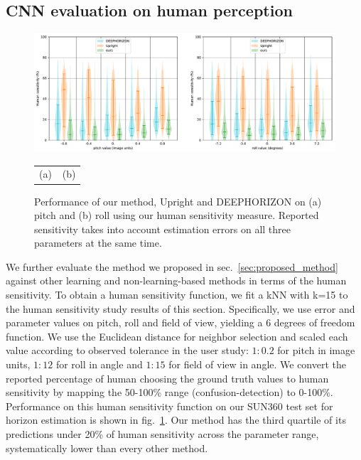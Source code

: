 \subsection{CNN evaluation on human perception}
\label{sec:cnn-evaluation-perception}

\begin{figure}
\centering
\includegraphics[width=\linewidth]{figures/method/human_sensitivity_performance_SUN360.pdf}
\begin{tabular}{p{0.5\linewidth}p{0.5\linewidth}}
\hspace{1.5cm}(a) & \hspace{1.3cm}(b)
\end{tabular}
\caption{Performance of our method, Upright and DEEPHORIZON on (a) pitch and (b) roll using our human sensitivity measure. Reported sensitivity takes into account estimation errors on all three parameters at the same time.}
\label{fig:method_human_performance}
\end{figure}


We further evaluate the method we proposed in sec.~\ref{sec:proposed_method} against other learning and non-learning-based methods in terms of the human sensitivity. To obtain a human sensitivity function, we fit a kNN with k=15 to the human sensitivity study results of this section. Specifically, we use error and parameter values on pitch, roll and field of view, yielding a 6 degrees of freedom function. We use the Euclidean distance for neighbor selection and scaled each value according to observed tolerance in the user study: $1{:}0.2$ for pitch in image units, $1{:}12$ for roll in angle and $1{:}15$ for field of view in angle. We convert the reported percentage of human choosing the ground truth values to human sensitivity by mapping the 50-100\% range (confusion-detection) to 0-100\%. Performance on this human sensitivity function on our SUN360 test set for horizon estimation is shown in fig.~\ref{fig:method_human_performance}. Our method has the third quartile of its predictions under 20\% of human sensitivity across the parameter range, systematically lower than every other method.
